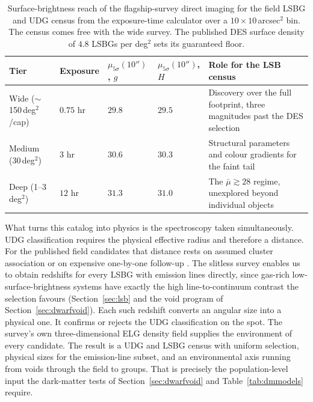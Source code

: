 \documentclass[10pt,onecolumn]{article}
\begin{document}
\begin{table}[tp]
\centering
\sffamily\small
\begin{tabularx}{\textwidth}{@{}p{2.2cm}p{2.2cm}p{2.6cm}p{2.6cm}X@{}}
\toprule
\textbf{Tier} & \textbf{Exposure} & \textbf{$\mu_{5\sigma}(10'')$, $g$} & \textbf{$\mu_{5\sigma}(10'')$, $H$} & \textbf{Role for the LSB census}\\
\midrule
Wide ($\sim$150\,deg$^2$/cap) & $0.75$ hr & $29.8$ & $29.5$ & Discovery over the full footprint, three magnitudes past the DES selection\\
Medium (30\,deg$^2$) & $3$ hr & $30.6$ & $30.3$ & Structural parameters and colour gradients for the faint tail\\
Deep (1--3\,deg$^2$) & $12$ hr & $31.3$ & $31.0$ & The $\bar\mu\gtrsim28$ regime, unexplored beyond individual objects\\
\bottomrule
\end{tabularx}
\caption{Surface-brightness reach of the flagship-survey direct imaging for the field LSBG and UDG census from the exposure-time calculator over a $10\times10$\,arcsec$^2$ bin. The census comes free with the wide survey. The published DES surface density of $4.8$ LSBGs per deg$^2$ \cite{tanoglidis2021} sets its guaranteed floor.}
\label{tab:lsbsurvey}
\end{table}

What turns this catalog into physics is the spectroscopy taken simultaneously. UDG classification requires the physical effective radius and therefore a distance. For the published field candidates that distance rests on assumed cluster association or on expensive one-by-one follow-up \cite{zaritsky2023}. The slitless survey enables us to obtain redshifts for every LSBG with emission lines directly, since gas-rich low-surface-brightness systems have exactly the high line-to-continuum contrast the selection favours (Section~\ref{sec:lsb} and the void program of Section~\ref{sec:dwarfvoid}). Each such redshift converts an angular size into a physical one. It confirms or rejects the UDG classification on the spot. The survey's own three-dimensional ELG density field supplies the environment of every candidate. The result is a UDG and LSBG census with uniform selection, physical sizes for the emission-line subset, and an environmental axis running from voids through the field to groups. That is precisely the population-level input the dark-matter tests of Section~\ref{sec:dwarfvoid} and Table~\ref{tab:dmmodels} require.
\end{document}

